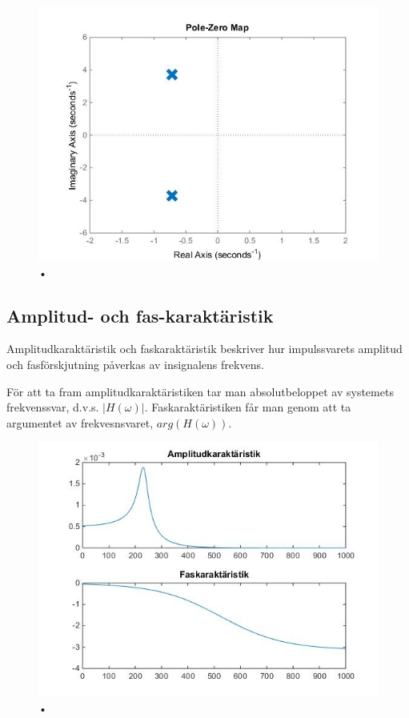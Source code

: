 \documentclass[10pt,a4paper]{article}
\begin{document}
\begin{figure}[h]
\begin{center}
\includegraphics[scale=0.5]{nolpol-diagram}
\caption{•}
\end{center}
\end{figure}

\newpage

\subsection{Amplitud- och fas-karaktäristik}

Amplitudkaraktäristik och faskaraktäristik beskriver hur impulssvarets amplitud och fasförskjutning påverkas av insignalens frekvens.

För att ta fram amplitudkaraktäristiken tar man absolutbeloppet av systemets frekvenssvar, d.v.s. $|H(\omega)|$. Faskaraktäristiken får man genom att ta argumentet av frekvesnsvaret, $arg(H(\omega))$. 

\begin{figure}[h]
\begin{center}
\includegraphics[scale=0.5]{FasAmpKar}
\caption{•}
\end{center}
\end{figure}
\end{document}

